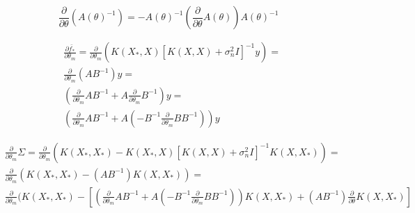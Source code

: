 \documentclass[12pt]{article}
\begin{document}
	\begin{displaymath}
	\frac{\partial}{\partial \theta}(A(\theta)^{-1}) = -A(\theta)^{-1} (\frac{\partial}{\partial \theta} A(\theta)) A(\theta)^{-1}
	\end{displaymath}

	\begin{align*}
	& \frac{\partial \bar{f_{*}}}{\partial \theta_{m}} = \frac{\partial}{\partial \theta_{m}}(K(X_{*},X)[K(X,X) +\sigma^{2}_{n}I]^{-1}y) = \\
	& \frac{\partial}{\partial \theta_{m}} (AB^{-1})y = \\
	& (\frac{\partial}{\partial \theta_{m}} AB^{-1} + A \frac{\partial}{\partial \theta_{m}}B^{-1})y = \\ 
	& (\frac{\partial}{\partial \theta_{m}} AB^{-1} + A (-B^{-1} \frac{\partial}{\partial \theta_{m}}B B^{-1}))y
	\end{align*}
	
	\begin{align*}
	& \frac{\partial}{\partial \theta_{m}}\Sigma = \frac{\partial}{\partial \theta_{m}} (K(X_{*},X_{*})-K(X_{*},X)[K(X,X) + \sigma^{2}_{n}I]^{-1}K(X,X_{*})) = \\
	& \frac{\partial}{\partial \theta_{m}} (K(X_{*},X_{*})-(AB^{-1})K(X,X_{*}))= \\
	& \frac{\partial}{\partial \theta_{m}} (K(X_{*},X_{*}) - [(\frac{\partial}{\partial \theta_{m}}AB^{-1} + A (-B^{-1} \frac{\partial}{\partial \theta_{m}}B B^{-1}))K(X,X_{*}) + (AB^{-1}) \frac{\partial}{\partial \theta} K(X,X_{*})] 
	\end{align*}
\end{document}
